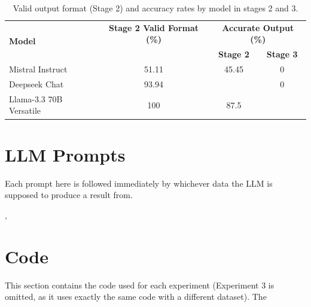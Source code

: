\documentclass{report}
\begin{document}
\begin{table}[H]
\centering
\begin{tabular}{lccc}
\toprule
\multirow{2}{*}{\textbf{Model}} &
\textbf{Stage 2 Valid Format (\%)} &
\multicolumn{2}{c}{\textbf{Accurate Output (\%)}} \\
& & \textbf{Stage 2\hspace{4pt}} & \textbf{Stage 3\hspace{4pt}} \\
\midrule
Mistral Instruct & 51.11 & 45.45 & 0 \\
Deepseek Chat & 93.94 & & 0 \\
Llama-3.3 70B Versatile & 100 & 87.5 & \\
\bottomrule
\end{tabular}
\caption{Valid output format (Stage 2) and accuracy rates by model in stages 2 and 3.}
\label{tab:accuracy-format-eval}
\end{table}





\clearpage

\section{LLM Prompts}
\label{app:llm-prompts}

Each prompt here is followed immediately by whichever data the LLM is supposed to produce a result from.

\lstset{float=false}

\begin{listing}[H]
\centering
\begin{minipage}{\linewidth}

\end{minipage}
\caption{Experiment 1 zero-shot prompt},
\end{listing}



\clearpage







\section{Code}

This section contains the code used for each experiment (Experiment 3 is omitted, as it uses exactly the same code with a different dataset). The


\end{document}
